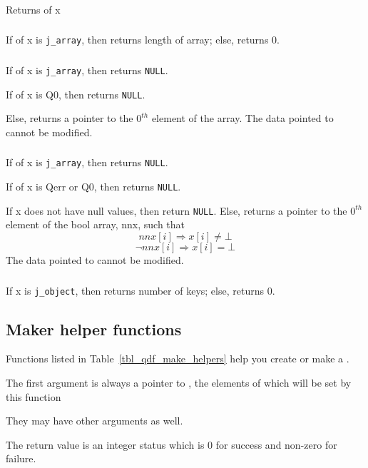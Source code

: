 \subsubsection{\getj}
Returns \jt of x 

\subsubsection{\getn}
If \jt of x is {\tt j\_array}, then returns length of array; else, returns 0.

\subsubsection{\getrv}
\bi
\item If \jt of x is {\tt j\_array}, then returns {\tt NULL}.
\item If \qt of x is Q0, then returns {\tt NULL}.
\item Else, returns a pointer to the \(0^{th}\) element of the array. 
  \ei
The data pointed to cannot be modified. 

\subsubsection{\getrnn}
\bi
\item If \jt of x is {\tt j\_array}, then returns {\tt NULL}.
\item If \qt of x is Qerr or Q0, then returns {\tt NULL}.
\item If x does not have null values, then return {\tt NULL}.
  \ei
Else, returns a pointer to the \(0^{th}\) element of the bool array, nnx,
such that 
\begin{displaymath}
  nnx[i] \Rightarrow x[i] \neq \bot
\end{displaymath}
\begin{displaymath}
  \neg nnx[i] \Rightarrow x[i] = \bot
\end{displaymath}
The data pointed to cannot be modified. 

\subsubsection{\getnk}
If \jt x is {\tt j\_object}, then returns number of keys; else, returns 0.


\subsection{Maker helper functions}
\label{qdf_make_helpers}
Functions listed in Table~\ref{tbl_qdf_make_helpers} help you create or make a \qdf.
\be
\item The first argument is always a pointer to \qdf, the elements of which will
  be set by this function
\item They may have other arguments as well. 
\item The return value is an integer status which is 0 for success 
  and non-zero for failure. 
  \ee


